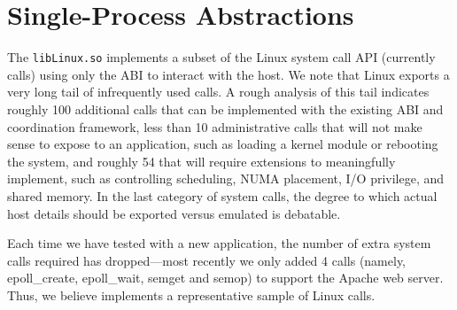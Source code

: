 \section{Single-Process Abstractions}







The \graphene{} {\tt libLinux.so} implements a subset 
of the Linux system call API (currently \graphenesyscallnum{} calls)
using only the \pal{} ABI to interact with the host.
We note that Linux exports a very long tail of infrequently used calls.
A rough analysis of this tail indicates roughly 100 additional calls that can be implemented
with the existing \pal{} ABI and coordination framework, less than 10 administrative calls that will not make sense to expose to 
an application, such as loading a kernel module or rebooting the system, and roughly 54 that will require 
\pal{} extensions to meaningfully implement, such as controlling scheduling,
NUMA placement, I/O privilege, and shared memory.
In the last category of system calls, the degree to which actual host details should be exported versus emulated is debatable.

Each time we have tested \graphene{} with a new application, the number of extra system calls
required has dropped---most recently we only added 4 calls
(namely, epoll\_create, epoll\_wait, semget and semop)
to support the Apache web server.
Thus, we believe \graphene{} implements a representative sample of Linux calls.




